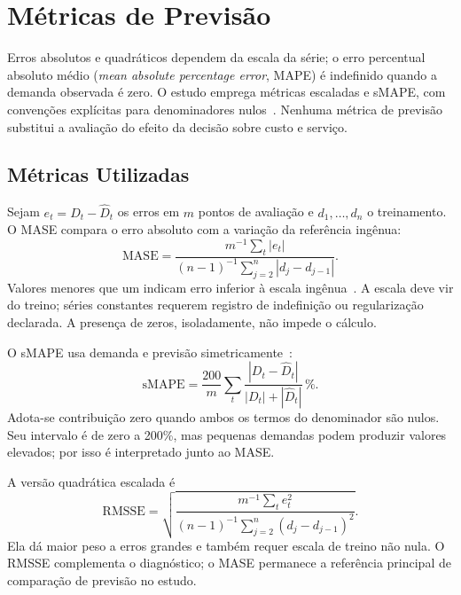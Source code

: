 \section{Métricas de Previsão}

Erros absolutos e quadráticos dependem da escala da série; o erro percentual absoluto médio (\textit{mean absolute percentage error}, MAPE) é indefinido quando a demanda observada é zero. O estudo emprega métricas escaladas e sMAPE, com convenções explícitas para denominadores nulos~\citep{Hyndman2006MASE,Makridakis2020M4Competition}. Nenhuma métrica de previsão substitui a avaliação do efeito da decisão sobre custo e serviço.

\subsection{Métricas Utilizadas}

Sejam $e_t=D_t-\hat D_t$ os erros em $m$ pontos de avaliação e $d_1,\ldots,d_n$ o treinamento. O MASE compara o erro absoluto com a variação da referência ingênua:
\begin{equation}
\mathrm{MASE}=\frac{m^{-1}\sum_t|e_t|}{(n-1)^{-1}\sum_{j=2}^{n}|d_j-d_{j-1}|}.
\label{eq:mase}
\end{equation}
Valores menores que um indicam erro inferior à escala ingênua~\citep{Hyndman2006MASE}. A escala deve vir do treino; séries constantes requerem registro de indefinição ou regularização declarada. A presença de zeros, isoladamente, não impede o cálculo.

O sMAPE usa demanda e previsão simetricamente~\citep{Makridakis1993SMAPE}:
\begin{equation}
\mathrm{sMAPE}=\frac{200}{m}\sum_t\frac{|D_t-\hat D_t|}{|D_t|+|\hat D_t|}\,\%.
\label{eq:smape}
\end{equation}
Adota-se contribuição zero quando ambos os termos do denominador são nulos. Seu intervalo é de zero a 200\%, mas pequenas demandas podem produzir valores elevados; por isso é interpretado junto ao MASE.

A versão quadrática escalada é
\begin{equation}
\mathrm{RMSSE}=\sqrt{\frac{m^{-1}\sum_te_t^2}{(n-1)^{-1}\sum_{j=2}^{n}(d_j-d_{j-1})^2}}.
\label{eq:rmsse}
\end{equation}
Ela dá maior peso a erros grandes e também requer escala de treino não nula. O RMSSE complementa o diagnóstico; o MASE permanece a referência principal de comparação de previsão no estudo.

